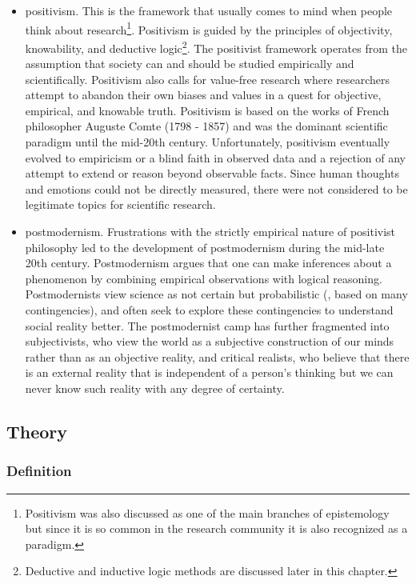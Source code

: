 \begin{itemize}
	\item \Gls{positivism}. This is the framework that usually comes to mind when people think about research\footnote{Positivism was also discussed as one of the main branches of epistemology but since it is so common in the research community it is also recognized as a paradigm.}. Positivism is guided by the principles of objectivity, knowability, and deductive logic\footnote{Deductive and inductive logic methods are discussed later in this chapter.}. The positivist framework operates from the assumption that society can and should be studied empirically and scientifically. Positivism also calls for value-free research where researchers attempt to abandon their own biases and values in a quest for objective, empirical, and knowable truth. Positivism is based on the works of French philosopher Auguste Comte (1798 - 1857) and was the dominant scientific paradigm until the mid-20th century. Unfortunately, positivism eventually evolved to empiricism or a blind faith in observed data and a rejection of any attempt to extend or reason beyond observable facts. Since human thoughts and emotions could not be directly measured, there were not considered to be legitimate topics for scientific research. 

	\item \Gls{postmodernism}. Frustrations with the strictly empirical nature of positivist philosophy led to the development of postmodernism during the mid-late 20th century. Postmodernism argues that one can make inferences about a phenomenon by combining empirical observations with logical reasoning. Postmodernists view science as not certain but probabilistic (\ie, based on many contingencies), and often seek to explore these contingencies to understand social reality better. The postmodernist camp has further fragmented into subjectivists, who view the world as a subjective construction of our minds rather than as an objective reality, and critical realists, who believe that there is an external reality that is independent of a person's thinking but we can never know such reality with any degree of certainty.

\end{itemize}

\subsection{Theory}

\subsubsection{Definition}

